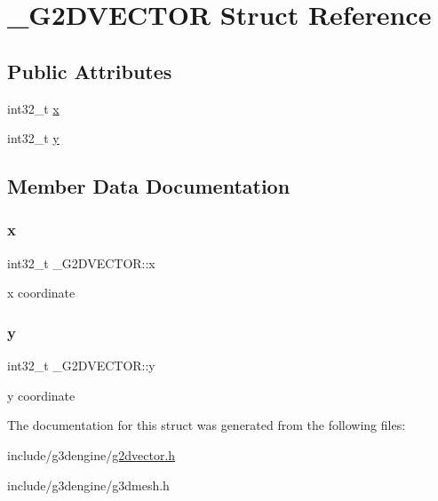 \hypertarget{struct__G2DVECTOR}{}\section{\+\_\+\+G2\+D\+V\+E\+C\+T\+OR Struct Reference}
\label{struct__G2DVECTOR}
\subsection*{Public Attributes}
\begin{DoxyCompactItemize}
\item 
int32\+\_\+t \hyperlink{struct__G2DVECTOR_aa8720c44d880d55e34e3e06744e4c246}{x}
\item 
int32\+\_\+t \hyperlink{struct__G2DVECTOR_a027080e7aaf3a43718d5461343a1fdb5}{y}
\end{DoxyCompactItemize}


\subsection{Member Data Documentation}
\mbox{\label{struct__G2DVECTOR_aa8720c44d880d55e34e3e06744e4c246}} 
\subsubsection{\texorpdfstring{x}{x}}
{\footnotesize\ttfamily int32\+\_\+t \+\_\+\+G2\+D\+V\+E\+C\+T\+O\+R\+::x}

x coordinate \mbox{\label{struct__G2DVECTOR_a027080e7aaf3a43718d5461343a1fdb5}} 
\subsubsection{\texorpdfstring{y}{y}}
{\footnotesize\ttfamily int32\+\_\+t \+\_\+\+G2\+D\+V\+E\+C\+T\+O\+R\+::y}

y coordinate 

The documentation for this struct was generated from the following files\+:\begin{DoxyCompactItemize}
\item 
include/g3dengine/\hyperlink{g2dvector_8h}{g2dvector.\+h}\item 
include/g3dengine/g3dmesh.\+h\end{DoxyCompactItemize}
